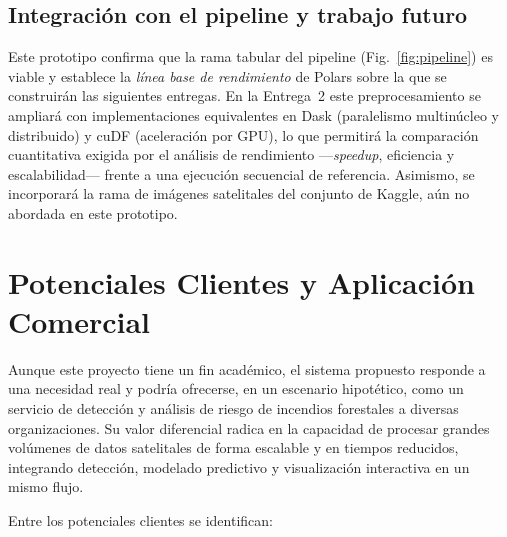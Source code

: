 \subsection{Integración con el pipeline y trabajo futuro}
Este prototipo confirma que la rama tabular del pipeline (Fig.~\ref{fig:pipeline}) es viable y establece la \textit{línea base de rendimiento} de Polars sobre la que se construirán las siguientes entregas. En la Entrega~2 este preprocesamiento se ampliará con implementaciones equivalentes en Dask (paralelismo multinúcleo y distribuido) y cuDF (aceleración por GPU), lo que permitirá la comparación cuantitativa exigida por el análisis de rendimiento —\textit{speedup}, eficiencia y escalabilidad— frente a una ejecución secuencial de referencia. Asimismo, se incorporará la rama de imágenes satelitales del conjunto de Kaggle, aún no abordada en este prototipo.

\section{Potenciales Clientes y Aplicación Comercial}
\label{sec:clientes}

Aunque este proyecto tiene un fin académico, el sistema propuesto responde a una necesidad real y podría ofrecerse, en un escenario hipotético, como un servicio de detección y análisis de riesgo de incendios forestales a diversas organizaciones. Su valor diferencial radica en la capacidad de procesar grandes volúmenes de datos satelitales de forma escalable y en tiempos reducidos, integrando detección, modelado predictivo y visualización interactiva en un mismo flujo.

Entre los potenciales clientes se identifican:

